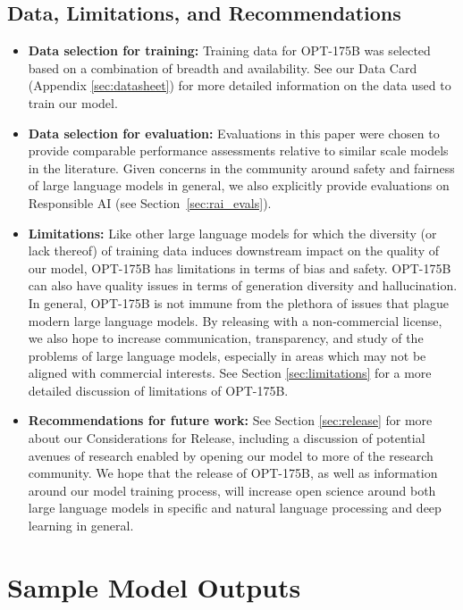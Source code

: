 \documentclass[11pt]{article}
\newcommand{\OPT}[0]{{OPT-175B}}
\begin{document}
\subsection{Data, Limitations, and Recommendations}
\begin{itemize}
    \item \textbf{Data selection for training:} Training data for \OPT{} was selected based on a combination of breadth and availability. See our Data Card (Appendix \ref{sec:datasheet}) for more detailed information on the data used to train our model. 
    \item \textbf{Data selection for evaluation:} Evaluations in this paper were chosen to provide comparable performance assessments relative to similar scale models in the literature. Given concerns in the community around safety and fairness of large language models in general, we also explicitly provide evaluations on Responsible AI (see Section~\ref{sec:rai_evals}). 
    \item \textbf{Limitations:} Like other large language models for which the diversity (or lack thereof) of training data induces downstream impact on the quality of our model, \OPT{} has limitations in terms of bias and safety. \OPT{} can also have quality issues in terms of generation diversity and hallucination. In general, \OPT{} is not immune from the plethora of issues that plague modern large language models. By releasing with a non-commercial license, we also hope to increase communication, transparency, and study of the problems of large language models, especially in areas which may not be aligned with commercial interests. See Section \ref{sec:limitations} for a more detailed discussion of limitations of \OPT{}. 
    \item \textbf{Recommendations for future work:} See Section \ref{sec:release} for more about our Considerations for Release, including a discussion of potential avenues of research enabled by opening our model to more of the research community. We hope that the release of \OPT{}, as well as information around our model training process, will increase open science around both large language models in specific and natural language processing and deep learning in general.
\end{itemize}
 
\clearpage
\section{Sample Model Outputs}
\label{sec:model_output}
\end{document}
